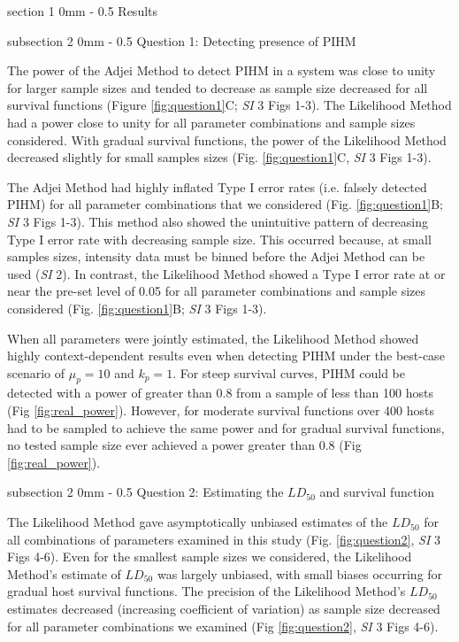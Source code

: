 \documentclass[12pt, a4paper]{article}
\makeatletter
\renewcommand{\section}{\@startsection
{section}%
{1}%
{0mm}%
{-\baselineskip}%
{0.5\baselineskip}%
{\normalfont\bf\large}} %
\renewcommand{\subsection}{\@startsection
{subsection}%
{2}%
{0mm}%
{-\baselineskip}%
{0.5\baselineskip}%
{\normalfont\bf}} %
\makeatother
\begin{document}
\section{Results}

\subsection{Question 1: Detecting presence of PIHM}

The power of the Adjei Method to detect PIHM in a
system was close to unity for larger sample sizes and tended to
decrease as sample size decreased for all survival functions (Figure \ref{fig:question1}C; \emph{SI} 3 Figs 1-3).  The Likelihood Method had a power close to
unity for all parameter combinations and sample sizes considered.  With gradual
survival functions, the power of the Likelihood Method decreased slightly for small samples sizes (Fig. \ref{fig:question1}C, \emph{SI} 3 Figs 1-3).

The Adjei Method had highly inflated Type I error rates (i.e. falsely detected
PIHM) for all parameter combinations that we
considered (Fig. \ref{fig:question1}B; \emph{SI} 3 Figs 1-3).  This method also showed the unintuitive pattern of decreasing Type I error
rate with decreasing sample size.  This occurred because, at small samples sizes, intensity data must be binned before the Adjei Method can be used (\emph{SI} 2).  In contrast, the Likelihood Method showed a Type I
error rate at or near the pre-set level of 0.05 for all parameter combinations
and sample sizes considered (Fig. \ref{fig:question1}B; \emph{SI} 3 Figs 1-3).

When all parameters were jointly estimated, the Likelihood Method showed highly
context-dependent results even when detecting PIHM under the best-case scenario of
$\mu_p = 10$ and $k_p = 1$. For steep survival curves, PIHM could be detected with a power of greater than 0.8 from a sample of less than 100 hosts (Fig \ref{fig:real_power}). However, for moderate survival functions over 400 hosts had to be sampled to achieve the same power and for gradual survival functions, no tested sample size ever achieved a power greater than 0.8 (Fig \ref{fig:real_power}).

\subsection{Question 2: Estimating the $LD_{50}$ and survival function}

The Likelihood Method gave asymptotically unbiased estimates of the $LD_{50}$
for all combinations of parameters examined in this study (Fig. \ref{fig:question2}, \emph{SI} 3 Figs 4-6).  Even for
the smallest sample sizes we considered, the Likelihood Method's estimate of $LD_{50}$
was largely unbiased, with small biases occurring for gradual host survival functions. The precision of the Likelihood Method's $LD_{50}$ estimates decreased
(increasing coefficient of variation) as sample size decreased for all
parameter combinations we examined (Fig \ref{fig:question2}, \emph{SI} 3 Figs 4-6).
\end{document}

